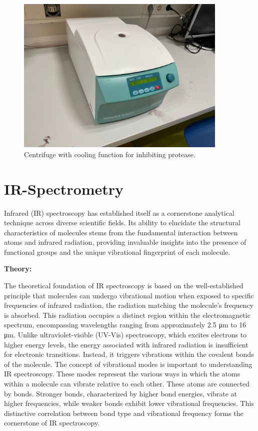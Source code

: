 \begin{figure}[H]
    \centering
    \includegraphics[width=0.9\textwidth]{./media/images/centrifuge_cooling}
    \caption{Centrifuge with cooling function for inhibiting protease.}
    \label{fig:centrifuge_cooling}
\end{figure}


\section{IR-Spectrometry}
Infrared (IR) spectroscopy has established itself as a cornerstone analytical technique across
diverse scientific fields. Its ability to elucidate the structural characteristics of molecules
stems from the fundamental interaction between atoms and infrared radiation, providing
invaluable insights into the presence of functional groups and the unique vibrational
fingerprint of each molecule.

\textbf{Theory:}

The theoretical foundation of IR spectroscopy is based on the well-established principle that
molecules can undergo vibrational motion when exposed to specific frequencies of infrared
radiation, the radiation matching the molecule's frequency is absorbed. This radiation
occupies a distinct region within the electromagnetic spectrum, encompassing wavelengths
ranging from approximately 2.5 μm to 16 μm. Unlike ultraviolet-visible (UV-Vis) spectroscopy,
which excites electrons to higher energy levels, the energy associated with infrared radiation
is insufficient for electronic transitions. Instead, it triggers vibrations within the covalent
bonds of the molecule.
The concept of vibrational modes is important to understanding IR spectroscopy. These
modes represent the various ways in which the atoms within a molecule can vibrate relative
to each other. These atoms are connected by bonds. Stronger bonds, characterized by higher
bond energies, vibrate at higher frequencies, while weaker bonds exhibit lower vibrational
frequencies. This distinctive correlation between bond type and vibrational frequency forms
the cornerstone of IR spectroscopy.


